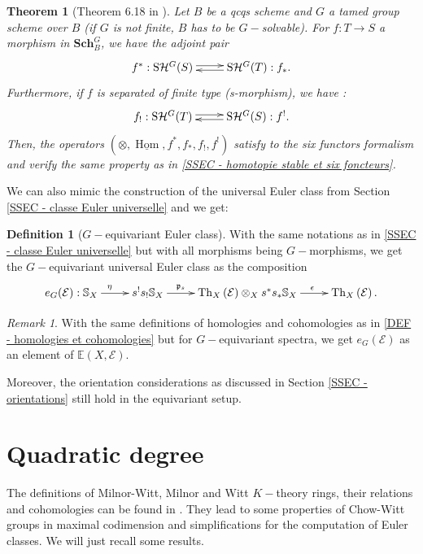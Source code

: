 \documentclass{amsart}
\theoremstyle{plain}%
\newtheorem{tho}[subsubsection]{Theorem}
\theoremstyle{remark}
\newtheorem{rmq}[subsubsection]{Remark}
\theoremstyle{definition}
\newtheorem{deff}[subsubsection]{Definition}
\newcommand{\cE}{\mathcal{E}}
\newcommand{\cH}{\mathcal{H}}
\newcommand{\eE}{\mathbb{E}}
\newcommand{\eS}{\mathbb{S}}
\newcommand{\fp}{\mathfrak{p}}
\newcommand{\Thom}[2][]{\operatorname{Th}_{#1}\left(#2\right)}
\newcommand{\StableHo}[2][]{\operatorname{S}\!\cH^{#1}\!\left(#2\right)}
\newcommand{\Schcat}{\mathbf{Sch}}
\begin{document}
\begin{tho}[Theorem 6.18 in \cite{Hoyois_G-equiv}]\label{THO - six foncteurs equivariants}
Let $B$ be a qcqs scheme and $G$ a tamed group scheme over $B$ (if $G$ is not finite, $B$ has to be $G-$solvable). For $f : T \to S $ a morphism in $\Schcat_B^G$, we have the adjoint pair
\[\xymatrix{f^\ast : \StableHo[G]{S} \ar@<+2pt>[r] & \StableHo[G]{T} : f_\ast. \ar@<+2pt>[l]}\]
Furthermore, if $f$ is separated of finite type (s-morphism), we have :
\[\xymatrix{f_! : \StableHo[G]{T} \ar@<+2pt>[r] & \StableHo[G]{S} : f^!. \ar@<+2pt>[l]}\]
Then, the operators $(\otimes, \underline{\operatorname{Hom}}, f^\ast,f_\ast,f_!,f^!)$ satisfy to the six functors formalism and verify the same property as in \ref{SSEC - homotopie stable et six foncteurs}.
\end{tho}

We can also mimic the construction of the universal Euler class from Section \ref{SSEC - classe Euler universelle} and we get:

\begin{deff}[$G-$equivariant Euler class]\label{DEF - classe Euler equivariante}
With the same notations as in \ref{SSEC - classe Euler universelle} but with all morphisms being $G-$morphisms, we get the $G-$equivariant universal Euler class as the composition
\[\xymatrix{e_G(\cE) : \eS_X \ar[r]^\eta & s^! s_{!}\eS_X \ar[r]^{\fp_{s}\qquad \quad } & \Thom[X]{\cE}\otimes_X s^\ast s_{\ast}\eS_X \ar[r]^{\qquad\epsilon}&\Thom[X]{\cE} .}\]
\end{deff}


\begin{rmq}
With the same definitions of homologies and cohomologies as in \ref{DEF - homologies et cohomologies} but for $G-$equivariant spectra, we get $e_G(\cE)$ as an element of $\eE(X,\cE)$.

Moreover, the orientation considerations as discussed in Section \ref{SSEC - orientations} still hold in the equivariant setup.
\end{rmq}

\section{Quadratic degree}\label{SEC - degre quadratique}
The definitions of Milnor-Witt, Milnor and Witt $K-$theory rings, their relations and cohomologies can be found in \cite[Section 3]{Cha_dP2-4}. They lead to some properties of Chow-Witt groups in maximal codimension and simplifications for the computation of Euler classes. We will just recall some results.
\end{document}
